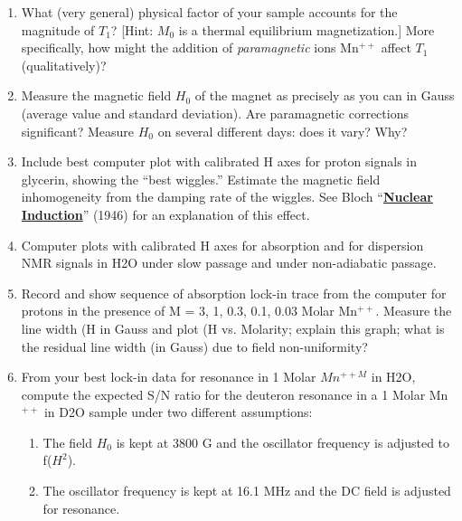 \documentclass{../lab}
\begin{document}
\begin{enumerate}
\begin{enumerate}
    \end{enumerate}

    \item What (very general) physical factor of your sample accounts for the magnitude of $T_1$? [Hint: $M_0$ is a thermal equilibrium magnetization.] More specifically, how might the addition of \emph{paramagnetic} ions Mn$^{++}$ affect $T_1$ (qualitatively)?

    \item Measure the magnetic field $H_0$ of the magnet as precisely as you can in Gauss (average value and standard deviation). Are paramagnetic corrections significant? Measure $H_0$ on several different days: does it vary? Why?

    \item Include best computer plot with calibrated H axes for proton signals in glycerin, showing the ``best wiggles.'' Estimate the magnetic field inhomogeneity from the damping rate of the wiggles. See Bloch  ``\href{https://drive.google.com/file/d/1E20OQIXEsAr961wahEr5t177JNK6EOAZ/view?usp=drive_link}{\textbf{Nuclear Induction}}'' (1946) for an explanation of this effect.

    \item Computer plots with calibrated H axes for absorption and for dispersion NMR signals in H2O under slow passage and under non-adiabatic passage.

    \item Record and show sequence of absorption lock-in trace from the computer for protons in the presence of M = 3, 1, 0.3, 0.1, 0.03 Molar Mn$^{++}$. Measure the line width (H in Gauss and plot (H vs. Molarity; explain this graph; what is the residual line width (in Gauss) due to field non-uniformity?

    \item From your best lock-in data for resonance in 1 Molar $Mn^{++M}$ in H2O, compute the expected S/N ratio for the deuteron resonance in a 1 Molar Mn$^{++}$ in D2O sample under two different assumptions:

    \begin{enumerate}
        \item The field $H_0$ is kept at 3800 G and the oscillator frequency is adjusted to f($H^2$).

        \item The oscillator frequency is kept at 16.1 MHz and the DC field is adjusted for resonance.

    \end{enumerate}


\end{enumerate}
\end{document}

